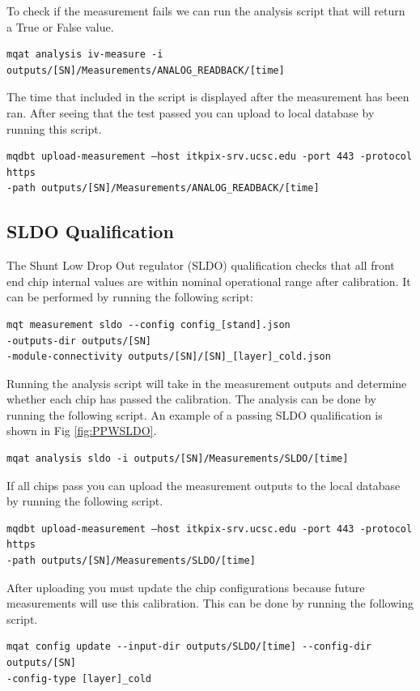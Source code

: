 \documentclass[12pt]{article}
\begin{document}
To check if the measurement fails we can run the analysis script that will return a True or False value. 
\begin{verbatim}
mqat analysis iv-measure -i outputs/[SN]/Measurements/ANALOG_READBACK/[time]
\end{verbatim}

The time that included in the script is displayed after the measurement has been ran. After seeing that the test passed you can upload to local database by running this script. 

\begin{verbatim}
mqdbt upload-measurement –host itkpix-srv.ucsc.edu -port 443 -protocol https
-path outputs/[SN]/Measurements/ANALOG_READBACK/[time]
\end{verbatim}

\subsection{SLDO Qualification}


The Shunt Low Drop Out regulator (SLDO) qualification checks that all front end chip internal values are within nominal operational range after calibration. It can be performed by running the following script:

\begin{verbatim}
mqt measurement sldo --config config_[stand].json 
-outputs-dir outputs/[SN]
-module-connectivity outputs/[SN]/[SN]_[layer]_cold.json
\end{verbatim}

Running the analysis script will take in the measurement outputs and determine whether each chip has passed the calibration. The analysis can be done by running the following script. An example of a passing SLDO qualification is shown in Fig \ref{fig:PPWSLDO}. 

\begin{verbatim}
mqat analysis sldo -i outputs/[SN]/Measurements/SLDO/[time]
\end{verbatim}
If all chips pass you can upload the measurement outputs to the local database by running the following script. 
\begin{verbatim}
mqdbt upload-measurement –host itkpix-srv.ucsc.edu -port 443 -protocol https
-path outputs/[SN]/Measurements/SLDO/[time]
\end{verbatim}
After uploading you must update the chip configurations because future measurements will use this calibration. This can be done by running the following script. 
\begin{verbatim}
mqat config update --input-dir outputs/SLDO/[time] --config-dir outputs/[SN] 
-config-type [layer]_cold
\end{verbatim}
\end{document}
